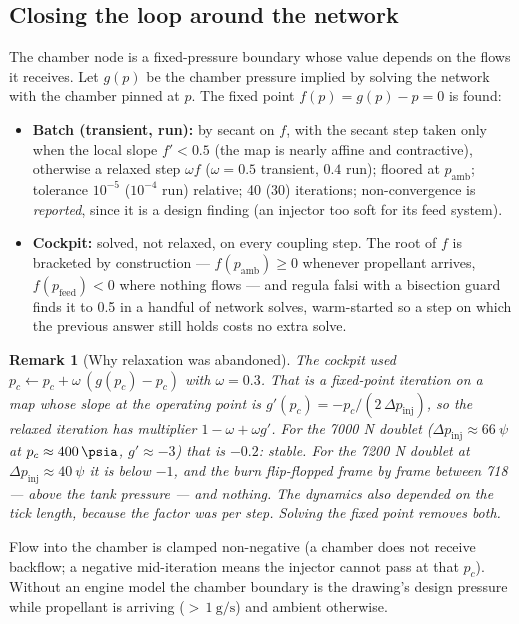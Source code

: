 \documentclass[11pt,a4paper]{article}
\newtheorem{remark}{Remark}
\begin{document}
\subsection{Closing the loop around the network}\label{sec:engineloop}
The chamber node is a fixed-pressure boundary whose value depends on the flows
it receives. Let $g(p)$ be the chamber pressure implied by solving the network
with the chamber pinned at $p$. The fixed point $f(p)=g(p)-p=0$ is found:
\begin{itemize}[nosep]
\item \textbf{Batch (transient, run):} by secant on $f$, with the secant step
      taken only when the local slope $f'<0.5$ (the map is nearly affine and
      contractive), otherwise a relaxed step $\omega f$ ($\omega=0.5$
      transient, $0.4$ run); floored at $p_{\mathrm{amb}}$; tolerance $10^{-5}$
      ($10^{-4}$ run) relative; 40 (30) iterations; non-convergence is
      \emph{reported}, since it is a design finding (an injector too soft for
      its feed system).
\item \textbf{Cockpit:} solved, not relaxed, on every coupling step. The
      root of $f$ is bracketed by construction --- $f(p_{\mathrm{amb}})\ge 0$
      whenever propellant arrives, $f(p_{\mathrm{feed}})<0$ where nothing
      flows --- and regula falsi with a bisection guard finds it to
      \SI{0.5}{\psi} in a handful of network solves, warm-started so a step
      on which the previous answer still holds costs no extra solve.
\end{itemize}
\begin{remark}[Why relaxation was abandoned]
The cockpit used $p_c\leftarrow p_c+\omega\,(g(p_c)-p_c)$ with $\omega=0.3$.
That is a fixed-point iteration on a map whose slope at the operating point
is $g'(p_c) = -p_c/(2\,\Delta p_{\mathrm{inj}})$, so the relaxed iteration
has multiplier $1-\omega+\omega g'$. For the 7000 N doublet
($\Delta p_{\mathrm{inj}}\approx\SI{66}{\psi}$ at $p_c\approx\SI{400}{\psia}$,
$g'\approx-3$) that is $-0.2$: stable. For the 7200 N doublet at
$\Delta p_{\mathrm{inj}}\approx\SI{40}{\psi}$ it is below $-1$, and the burn
flip-flopped frame by frame between \SI{718}{\psia} --- above the tank
pressure --- and nothing. The dynamics also depended on the tick length,
because the factor was per step. Solving the fixed point removes both.
\end{remark}
Flow into the chamber is clamped non-negative (a chamber does not receive
backflow; a negative mid-iteration means the injector cannot pass at that
$p_c$). Without an engine model the chamber boundary is the drawing's design
pressure while propellant is arriving (${>}\,\SI{1}{\gram\per\second}$) and
ambient otherwise.
\end{document}
